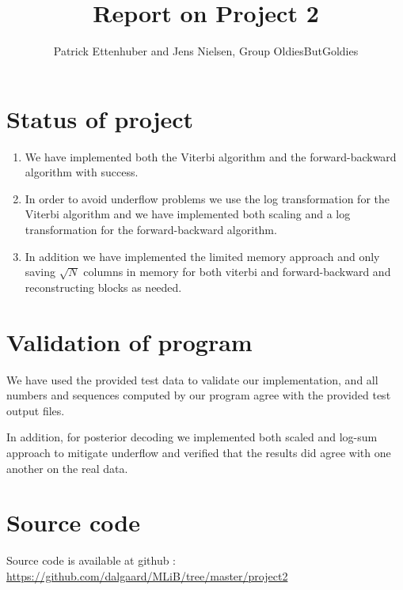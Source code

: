 \documentclass[11pt]{article}
\title{Report on Project 2}
\author{Patrick Ettenhuber and Jens Nielsen, Group OldiesButGoldies}
\begin{document}
\maketitle

\section*{Status of project}

\begin{enumerate}
\item We have implemented both the Viterbi algorithm and the
  forward\--backward algorithm with success.
\item In order to avoid underflow problems we use the log transformation for
	the Viterbi algorithm and we have implemented both scaling  and a log
	transformation for the forward\--backward algorithm.
\item In addition we have implemented the limited memory approach and
  only saving $\sqrt{N}$ columns in memory for both viterbi and
  forward\--backward and reconstructing blocks as needed.
\end{enumerate}

\section*{Validation of program}

We have used the provided test data to
validate our implementation, and all numbers and sequences computed by
our program agree with the provided test output files.

In addition, for posterior decoding we implemented both scaled and
log-sum approach to mitigate underflow and verified that the results
did agree with one another on the real data.

\section*{Source code}

Source code is available at github : \url{https://github.com/dalgaard/MLiB/tree/master/project2}
\end{document}
